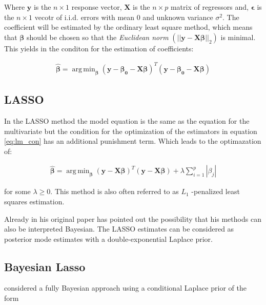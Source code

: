 \documentclass[12pt,a4paper]{article}
\DeclareMathOperator*{\argmin}{arg\,min}
\begin{document}
Where \(\pmb{y}\) is the \(n \times 1\) response vector, \(\pmb{X}\) is
the \(n \times p\) matrix of regressors and, \(\pmb{\epsilon}\) is the
\(n \times 1\) vecotr of \ac{i.i.d.} errors with mean 0 and unknown
variance \(\sigma^2\). The coefficient will be estimated by the ordinary
least square method, which means that \(\pmb{\beta}\) should be chosen
so that the \emph{Euclidean norm}
\(\left( || \mathbf{y - X\beta} ||_2 \right)\) is minimal. This yields
in the conditon for the estimation of coefficients:

\begin{align}
\label{eq:lm_con}
 \hat{\pmb{\beta}} = \argmin_{ \pmb{\beta}} (\pmb{y - \beta_0 - X  \beta})^T (\pmb{y - \beta_0 - X  \beta})
\end{align}

\hypertarget{section}{%
\subsection{\texorpdfstring{\acf{LASSO}}{}}\label{section}}

In the \ac{LASSO} method the model equation is the same as the equation
for the multivariate but the condition for the optimization of the
estimators in equation \eqref{eq:lm_con} has an additional punishment
term. Which leads to the optimazation of:

\begin{align}
\label{eq:la_con}
\hat{\pmb{\beta}} = \argmin_{\pmb{\beta}}  \left( \pmb{y - X \beta} \right)^T \left( \pmb{y - X \beta} \right) + \lambda \sum_{i = 1}^{p} |\beta_j|
\end{align}

for some \(\lambda \geq 0\). This method is also often referred to as
\(L_1\) -penalized least squares estimation.

Already in his original paper \textcite{tibshirani_regression_1996} has
pointed out the possibility that his methods can also be interpreted
Bayesian. The LASSO estimates can be considered as posterior mode
estimates with a double-exponential Laplace prior.

\hypertarget{bayesian-lasso}{%
\subsection{Bayesian Lasso}\label{bayesian-lasso}}

\textcite{park_bayesian_2008} considered a fully Bayesian approach using
a conditional Laplace prior of the form
\end{document}
